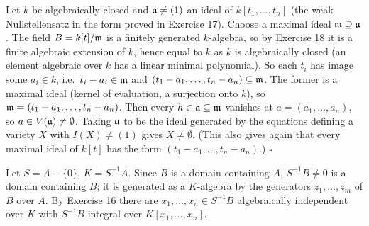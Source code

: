 \documentclass[11pt]{article}
\begin{document}
\pf
Let $k$ be algebraically closed and $\mathfrak a\ne(1)$ an ideal of $k[t_1,\dots,t_n]$ (the weak Nullstellensatz in the form proved in Exercise 17). Choose a maximal ideal $\mathfrak m\supseteq\mathfrak a$. The field $B=k[t]/\mathfrak m$ is a finitely generated $k$-algebra, so by Exercise 18 it is a finite algebraic extension of $k$, hence equal to $k$ as $k$ is algebraically closed (an element algebraic over $k$ has a linear minimal polynomial). So each $t_i$ has image some $a_i\in k$, i.e.\ $t_i-a_i\in\mathfrak m$ and $(t_1-a_1,\dots,t_n-a_n)\subseteq\mathfrak m$. The former is a maximal ideal (kernel of evaluation, a surjection onto $k$), so $\mathfrak m=(t_1-a_1,\dots,t_n-a_n)$. Then every $h\in\mathfrak a\subseteq\mathfrak m$ vanishes at $a=(a_1,\dots,a_n)$, so $a\in V(\mathfrak a)\ne\emptyset$. Taking $\mathfrak a$ to be the ideal generated by the equations defining a variety $X$ with $I(X)\ne(1)$ gives $X\ne\emptyset$. (This also gives again that every maximal ideal of $k[t]$ has the form $(t_1-a_1,\dots,t_n-a_n)$.) \hfill$\square$

\pf
Let $S=A-\{0\}$, $K=S^{-1}A$. Since $B$ is a domain containing $A$, $S^{-1}B\ne0$ is a domain containing $B$; it is generated as a $K$-algebra by the generators $z_1,\dots,z_m$ of $B$ over $A$. By Exercise 16 there are $x_1,\dots,x_n\in S^{-1}B$ algebraically independent over $K$ with $S^{-1}B$ integral over $K[x_1,\dots,x_n]$.
\end{document}
